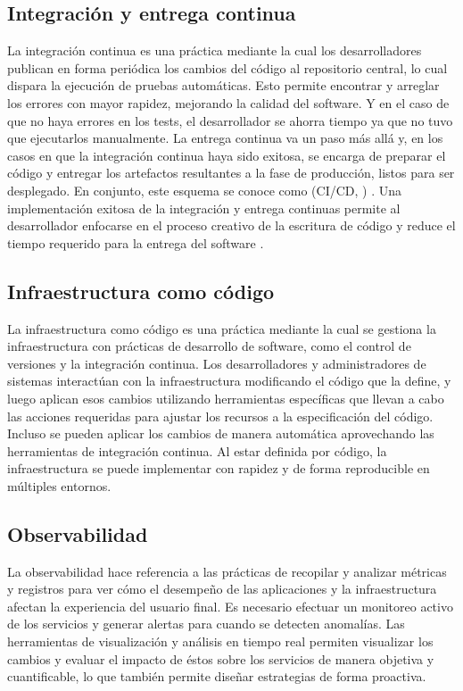 \subsection{Integración y entrega continua}
%
La integración continua es una práctica mediante la cual los
desarrolladores publican en forma periódica los cambios del código al
repositorio central, lo cual dispara la ejecución de pruebas
automáticas. Esto permite encontrar y arreglar los errores con mayor
rapidez, mejorando la calidad del software. Y en el caso de que no
haya errores en los tests, el desarrollador se ahorra tiempo ya que no
tuvo que ejecutarlos manualmente. La entrega continua va un paso más
allá y, en los casos en que la integración continua haya sido exitosa,
se encarga de preparar el código y entregar los artefactos resultantes
a la fase de producción, listos para ser desplegado. En conjunto, este
esquema se conoce como  (CI/CD,
)
\cite{devopscicd}. Una implementación exitosa de la integración y
entrega continuas permite al desarrollador enfocarse en el proceso
creativo de la escritura de código y reduce el tiempo requerido para
la entrega del software \cite{humblefarley}.
%
\subsection{Infraestructura como código}
%
La infraestructura como código es una práctica mediante la cual se
gestiona la infraestructura con prácticas de desarrollo de software,
como el control de versiones y la integración continua. Los
desarrolladores y administradores de sistemas interactúan con la
infraestructura modificando el código que la define, y luego aplican
esos cambios utilizando herramientas específicas que llevan a cabo las
acciones requeridas para ajustar los recursos a la especificación del
código. Incluso se pueden aplicar los cambios de manera automática
aprovechando las herramientas de integración continua. Al estar
definida por código, la infraestructura se puede implementar con
rapidez y de forma reproducible en múltiples entornos.

\subsection{Observabilidad}

La observabilidad hace referencia a las prácticas de recopilar y
analizar métricas y registros para ver cómo el desempeño de las
aplicaciones y la infraestructura afectan la experiencia del usuario
final. Es necesario efectuar un monitoreo activo de los servicios y
generar alertas para cuando se detecten anomalías. Las herramientas de
visualización y análisis en tiempo real permiten visualizar los
cambios y evaluar el impacto de éstos sobre los servicios de manera
objetiva y cuantificable, lo que también permite diseñar estrategias
de forma proactiva.

